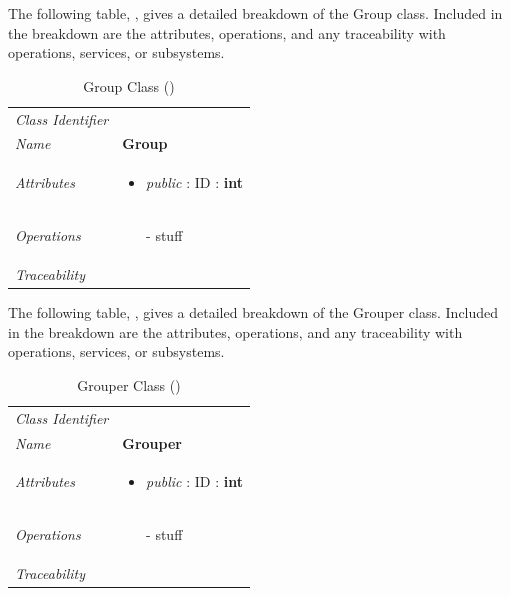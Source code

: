 \documentclass[12pt,letterpaper]{article}
\begin{document}
The following table, , gives a detailed breakdown of the Group class. Included in the breakdown are the attributes, operations, and any traceability with operations, services, or subsystems.

\begin{table}[H]
    \caption{Group Class ()} 
	\begin{tabu} to 
		\toprule
		Class Identifier &  \\
		Name & {\bf Group} \\
		Attributes & 
		\begin{minipage}[t]{\linewidth}
		    \begin{itemize}
		        \item \textit{public} : ID : \bf{int}
			\end{itemize}
	    \end{minipage} \\

		Operations &
		\begin{minipage}[t]{\linewidth}
			\begin{enumerate}
			    \item[-] stuff
	        \end{enumerate}
	    \end{minipage} \\
	    	Traceability & \\
		\toprule
	\end{tabu}
\end{table}

The following table, , gives a detailed breakdown of the Grouper class. Included in the breakdown are the attributes, operations, and any traceability with operations, services, or subsystems.

\begin{table}[H]
    \caption{Grouper Class ()} 
	\begin{tabu} to 
		\toprule
		Class Identifier &  \\
		Name & {\bf Grouper} \\
		Attributes & 
		\begin{minipage}[t]{\linewidth}
		    \begin{itemize}
		        \item \textit{public} : ID : \bf{int}
			\end{itemize}
	    \end{minipage} \\

		Operations &
		\begin{minipage}[t]{\linewidth}
			\begin{enumerate}
			    \item[-] stuff
	        \end{enumerate}
	    \end{minipage} \\
	    	Traceability & \\
		\toprule
	\end{tabu}
\end{table}
\end{document}

